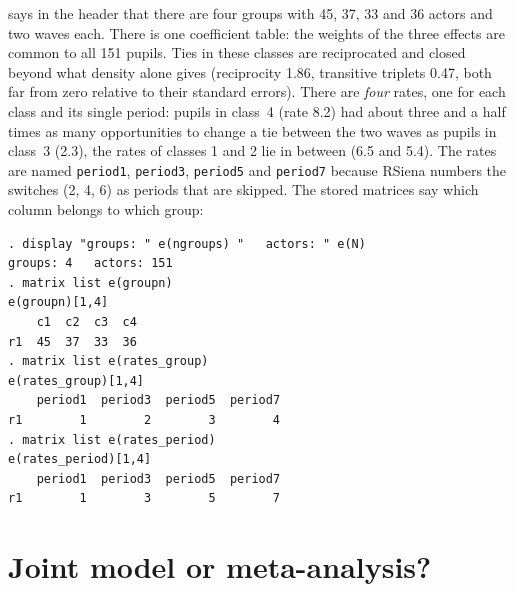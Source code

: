 \nwsaom{} says in the header that there are four groups with 45, 37, 33 and 36 actors and two waves each. There is one coefficient table: the weights of the three effects are common to all 151 pupils. Ties in these classes are reciprocated and closed beyond what density alone gives (reciprocity 1.86, transitive triplets 0.47, both far from zero relative to their standard errors). There are \emph{four} rates, one for each class and its single period: pupils in class~4 (rate 8.2) had about three and a half times as many opportunities to change a tie between the two waves as pupils in class~3 (2.3), the rates of classes 1 and 2 lie in between (6.5 and 5.4). The rates are named \texttt{period1}, \texttt{period3}, \texttt{period5} and \texttt{period7} because RSiena numbers the switches (2, 4, 6) as periods that are skipped. The stored matrices say which column belongs to which group:
\begin{lstlisting}
. display "groups: " e(ngroups) "   actors: " e(N)
groups: 4   actors: 151
. matrix list e(groupn)
e(groupn)[1,4]
    c1  c2  c3  c4
r1  45  37  33  36
. matrix list e(rates_group)
e(rates_group)[1,4]
    period1  period3  period5  period7
r1        1        2        3        4
. matrix list e(rates_period)
e(rates_period)[1,4]
    period1  period3  period5  period7
r1        1        3        5        7
\end{lstlisting}

\section{Joint model or meta-analysis?}\label{sec:groups-vs-meta}

